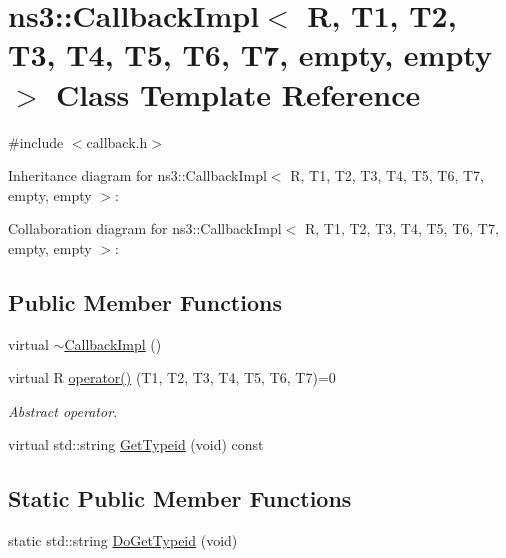\hypertarget{classns3_1_1CallbackImpl_3_01R_00_01T1_00_01T2_00_01T3_00_01T4_00_01T5_00_01T6_00_01T7_00_01empty_00_01empty_01_4}{}\section{ns3\+:\+:Callback\+Impl$<$ R, T1, T2, T3, T4, T5, T6, T7, empty, empty $>$ Class Template Reference}
\label{classns3_1_1CallbackImpl_3_01R_00_01T1_00_01T2_00_01T3_00_01T4_00_01T5_00_01T6_00_01T7_00_01empty_00_01empty_01_4}


{\ttfamily \#include $<$callback.\+h$>$}



Inheritance diagram for ns3\+:\+:Callback\+Impl$<$ R, T1, T2, T3, T4, T5, T6, T7, empty, empty $>$\+:


Collaboration diagram for ns3\+:\+:Callback\+Impl$<$ R, T1, T2, T3, T4, T5, T6, T7, empty, empty $>$\+:
\subsection*{Public Member Functions}
\begin{DoxyCompactItemize}
\item 
virtual \hyperlink{classns3_1_1CallbackImpl_3_01R_00_01T1_00_01T2_00_01T3_00_01T4_00_01T5_00_01T6_00_01T7_00_01empty_00_01empty_01_4_a3fde8db532d5b902e112a01c3e704e62}{$\sim$\+Callback\+Impl} ()
\item 
virtual R \hyperlink{classns3_1_1CallbackImpl_3_01R_00_01T1_00_01T2_00_01T3_00_01T4_00_01T5_00_01T6_00_01T7_00_01empty_00_01empty_01_4_a09210ce6ce3f40e91f1062ed90dd6442}{operator()} (T1, T2, T3, T4, T5, T6, T7)=0
\begin{DoxyCompactList}\small\item\em Abstract operator. \end{DoxyCompactList}\item 
virtual std\+::string \hyperlink{classns3_1_1CallbackImpl_3_01R_00_01T1_00_01T2_00_01T3_00_01T4_00_01T5_00_01T6_00_01T7_00_01empty_00_01empty_01_4_ac605579aa990b07cf86f050ca1342aca}{Get\+Typeid} (void) const 
\end{DoxyCompactItemize}
\subsection*{Static Public Member Functions}
\begin{DoxyCompactItemize}
\item 
static std\+::string \hyperlink{classns3_1_1CallbackImpl_3_01R_00_01T1_00_01T2_00_01T3_00_01T4_00_01T5_00_01T6_00_01T7_00_01empty_00_01empty_01_4_af70dfcb4eaabc41783058f2843ae6483}{Do\+Get\+Typeid} (void)
\end{DoxyCompactItemize}
